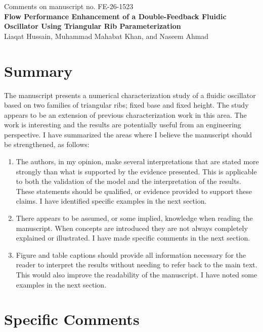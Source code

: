 \documentclass[11pt]{article}
\begin{document}
	
	\begin{center}
		Comments on manuscript no. FE-26-1523\\[0.75em]
		
		{\large \textbf{Flow Performance Enhancement of a Double-Feedback Fluidic Oscillator Using Triangular Rib Parameterization}}\\[0.5em]
		
		Liaqat Hussain, Muhammad Mahabat Khan, and Naseem Ahmad
	\end{center}
	
	\section*{Summary}
	
	The manuscript presents a numerical characterization study of a fluidic oscillator based on two families of triangular ribs; fixed base and fixed height. The study appears to be an extension of previous characterization work in this area. The work is interesting and the results are potentially useful from an engineering perspective. I have summarized the areas where I believe the manuscript should be strengthened, as follows:
	
	\begin{enumerate}
		\item The authors, in my opinion, make several interpretations that are stated more strongly than what is supported by the evidence presented. This is applicable to both the validation of the model and the interpretation of the results. These statements should be qualified, or evidence provided to support these claims. I have identified specific examples in the next section.
		\item There appears to be assumed, or some implied, knowledge when reading the manuscript. When concepts are introduced they are not always completely explained or illustrated. I have made specific comments in the next section.
		\item Figure and table captions should provide all information necessary for the reader to interpret the results without needing to refer back to the main text. This would also improve the readability of the manuscript. I have noted some examples in the next section.
	\end{enumerate}
	
	\section*{Specific Comments}
	
\end{document}
